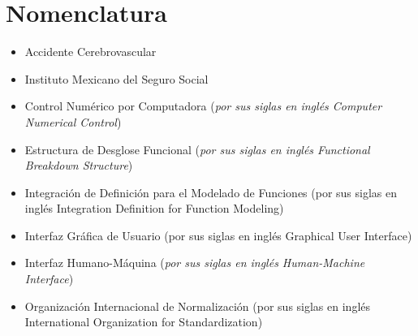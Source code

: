 
\chapter{Nomenclatura}
\begin{itemize}[font=\bfseries]
	\item [ACV] Accidente Cerebrovascular
	\item[IMSS] Instituto Mexicano del Seguro Social
	\item[CNC] Control Numérico por Computadora (\textit{por sus siglas en inglés Computer Numerical Control})
	\item[FBS] Estructura de Desglose Funcional (\textit{por sus siglas en inglés Functional Breakdown Structure})
	\item[IDEF0] Integración de Definición para el Modelado de Funciones (por sus siglas en inglés Integration Definition for Function Modeling)
	\item[GUI] Interfaz Gráfica de Usuario (por sus siglas en inglés Graphical User Interface)
	\item[HMI] Interfaz Humano-Máquina (\textit{por sus siglas en inglés Human-Machine Interface})
	\item[ISO] Organización Internacional de Normalización (por sus siglas en inglés International Organization for Standardization)
\end{itemize}


\vspace*{\fill}